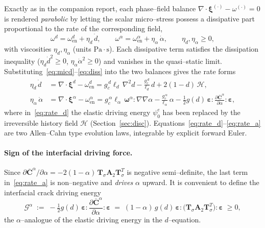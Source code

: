 \documentclass[12pt,a4paper]{article}
\newcommand{\beps}{\boldsymbol{\varepsilon}}
\newcommand{\bxi}{\boldsymbol{\xi}}
\newcommand{\bomega}{\boldsymbol{\omega}}
\newcommand{\Ca}{\overline{\mathbf{C}}^{\alpha}}     %
\newcommand{\Tsig}{\mathbf{T}_{\!\sigma}}            %
\begin{document}
	Exactly as in the companion report, each phase--field balance
	$\nabla\cdot\bxi^{(\cdot)}-\omega^{(\cdot)}=0$ is rendered \emph{parabolic} by
	letting the scalar micro--stress possess a dissipative part proportional to the
	rate of the corresponding field,
	\begin{equation}\label{eq:diss}
		\omega^{d} = \omega_{\mathrm{en}}^{d} + \eta_d\,\dot d,
		\qquad
		\omega^{\alpha} = \omega_{\mathrm{en}}^{\alpha} + \eta_\alpha\,\dot\alpha,
		\qquad \eta_d,\eta_\alpha\ge 0,
	\end{equation}
	with viscosities $\eta_d,\eta_\alpha$ (units $\mathrm{Pa\cdot s}$). Each
	dissipative term satisfies the dissipation inequality
	($\eta_d\dot d^2\ge0$, $\eta_\alpha\dot\alpha^2\ge0$) and vanishes in the
	quasi--static limit. Substituting~\eqref{eq:micd}--\eqref{eq:diss} into the two
	balances gives the rate forms
	\begin{align}
		\eta_d\,\dot d &= \nabla\cdot\bxi^{d} - \omega_{\mathrm{en}}^{d}
		= g_c^{\,d}\ell_d\,\nabla^2 d - \frac{g_c^{\,d}}{\ell_d}\,d + 2(1-d)\,\mathcal{H}, \label{eq:rate_d}\\[4pt]
		\eta_\alpha\,\dot\alpha &= \nabla\cdot\bxi^{\alpha} - \omega_{\mathrm{en}}^{\alpha}
		= g_c^{\,\alpha}\ell_\alpha\,\bomega^{\alpha}\!:\nabla\nabla\alpha
		- \frac{g_c^{\,\alpha}}{\ell_\alpha}\,\alpha
		- \tfrac12 g(d)\,\beps:\frac{\partial\Ca}{\partial\alpha}:\beps, \label{eq:rate_a}
	\end{align}
	where in~\eqref{eq:rate_d} the elastic driving energy $\psi_0^{e}$ has been
	replaced by the irreversible history field $\mathcal{H}$ (Section~\ref{sec:disc}).
	Equations~\eqref{eq:rate_d}--\eqref{eq:rate_a} are two Allen--Cahn type evolution
	laws, integrable by explicit forward Euler.

	\paragraph{Sign of the interfacial driving force.}
	Since $\partial\Ca/\partial\alpha=-2(1-\alpha)\,\Tsig\mathbf{A}_2\Tsig^{T}$ is
	negative semi--definite, the last term in~\eqref{eq:rate_a} is non--negative and
	\emph{drives} $\alpha$ upward. It is convenient to define the interfacial crack
	driving energy
	\begin{equation}\label{eq:Galpha}
		\mathcal{G}^{\alpha} \;:=\; -\tfrac12 g(d)\,\beps:\frac{\partial\Ca}{\partial\alpha}:\beps
		\;=\; (1-\alpha)\,g(d)\,\beps:\bigl(\Tsig\mathbf{A}_2\Tsig^{T}\bigr):\beps \;\ge 0,
	\end{equation}
	the $\alpha$--analogue of the elastic driving energy in the $d$--equation.
\end{document}
